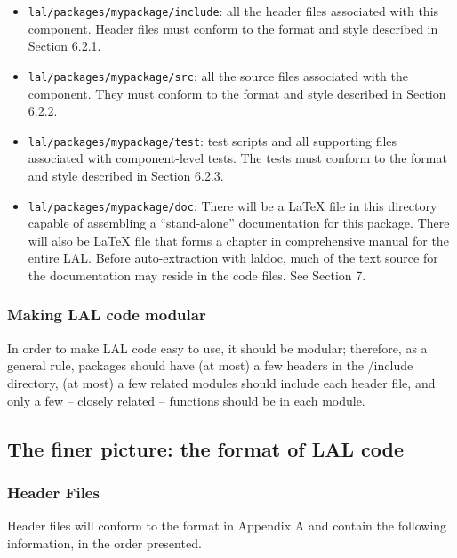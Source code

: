 \documentclass[]{ligodcc}
\begin{document}
\begin{itemize}
\item
{\tt lal/packages/mypackage/include}: all the header files
associated with this component.  Header files must conform to the
format and style described in Section 6.2.1.

\item
{\tt lal/packages/mypackage/src}:  all the source files associated
with the component. They must conform to the format and style
described in Section 6.2.2.


\item
{\tt lal/packages/mypackage/test}:  test scripts and all supporting
files  associated with component-level tests. The tests must conform
to the format and style described in Section 6.2.3.

\item
{\tt lal/packages/mypackage/doc}: There will be a LaTeX file in this
directory capable of assembling a ``stand-alone'' documentation for
this package. There will also be LaTeX file that forms a chapter in
comprehensive manual for the entire LAL. Before auto-extraction with
laldoc, much of the text source for the documentation may reside in
the code files. See Section 7.

\end{itemize}

\subsubsection{Making LAL code modular}

In order to make LAL code easy to use, it should be modular;
therefore, as a general rule, packages should have (at most) a few
headers in the /include directory, (at most) a few  related modules
should include each header file,  and only a few -- closely related
-- functions should be in each module.


\subsection{The finer picture: the format of LAL code}

\subsubsection{Header Files}

Header files  will conform to the format in Appendix A and contain the
following information, in the order presented.
\end{document}
